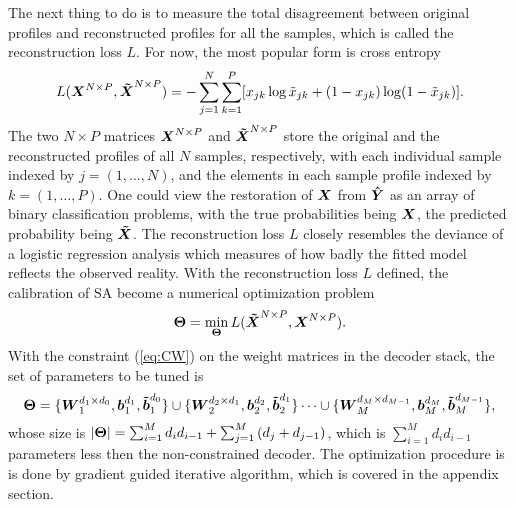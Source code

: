 The next thing to do is to measure the total disagreement between original profiles and reconstructed profiles for all the samples, which is called the reconstruction loss $L$. For now, the most popular form is cross entropy
\newcommand{\XECD}{\XEC^{N \times P}}   %
\newcommand{\XDCD}{\XDC^{N \times P}}   %
\newcommand{\YHTD}{\YHT^{N \times P}}   %
\begin{equation} \label{eq:CE}
  L(\XECD, \XDCD) = -\sum_{j=1}^{N}{\sum_{k=1}^P[x_{jk}\log{\tilde{x}_{jk}}+(1-x_{jk})\log(1-\tilde{x}_{jk})]}.
\end{equation}
The two $N \times P$ matrices $\XECD$ and $\XDCD$ store the original and the reconstructed profiles of all $N$ samples, respectively, with each individual sample indexed by $j=(1, \dots, N)$, and the elements in each sample profile indexed by $k = (1, \dots, P)$. One could view the restoration of $\boldsymbol{X}$ from $\boldsymbol{\hat{Y}}$ as an array of binary classification problems, with the true probabilities being $\boldsymbol{X}$, the predicted probability being $\boldsymbol{\tilde{X}}$. The reconstruction loss $L$ closely resembles the deviance of a logistic regression analysis which measures of how badly the fitted model reflects the observed reality. With the reconstruction loss $L$ defined, the calibration of SA become a numerical optimization problem
\[ \Par = \min_{\Par} L(\XDCD, \XECD). \]
With the constraint (\ref{eq:CW}) on the weight matrices in the decoder stack, the set of parameters to be tuned is
\[ \boldsymbol{\Theta} = \{\boldsymbol{W}_{1}^{d_{1} \times d_{0}}, \boldsymbol{b}_{1}^{d_{1}}, \boldsymbol{\tilde{b}}_{1}^{d_{0}}\} \cup \{\boldsymbol{W}_{2}^{d_{2} \times d_{1}}, \boldsymbol{b}_{2}^{d_{2}}, \boldsymbol{\tilde{b}}_{2}^{d_{1}}\} \dots \cup \{\boldsymbol{W}_{M}^{d_{M} \times d_{M-1}}, \boldsymbol{b}_{M}^{d_{M}}, \boldsymbol{\tilde{b}}_{M}^{d_{M-1}}\}, \]
whose size is $|\boldsymbol{\Theta}| = \sum_{i=1}^M{d_i d_{i-1}} + \sum_{j=1}^M{(d_j + d_{j-1})}$, which is $\sum_{i=1}^M{d_i d_{i-1}}$ parameters less then the non-constrained decoder. The optimization procedure is is done by gradient guided iterative algorithm, which is covered in the appendix section.

